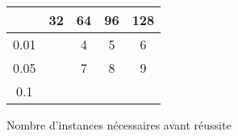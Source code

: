 \documentclass{article}		%
\theoremstyle{definition}
\theoremstyle{plain}
\theoremstyle{plain}
\theoremstyle{plain}
\theoremstyle{plain}
\begin{document}
\begin{figure}
\caption{Nombre d'instances nécessaires avant réussite}
\begin{center}
\begin{tabular}{|c |c | c | c | c | }
\hline
   & 32 & 64 & 96 & 128 \\
\hline
 0.01  & &4 & 5 & 6 \\
\hline
  0.05 & &7 & 8 & 9 \\
\hline
 0.1 & & & & \\
 \hline
 \end{tabular}
\end{center}
\end{figure}



\end{document}
